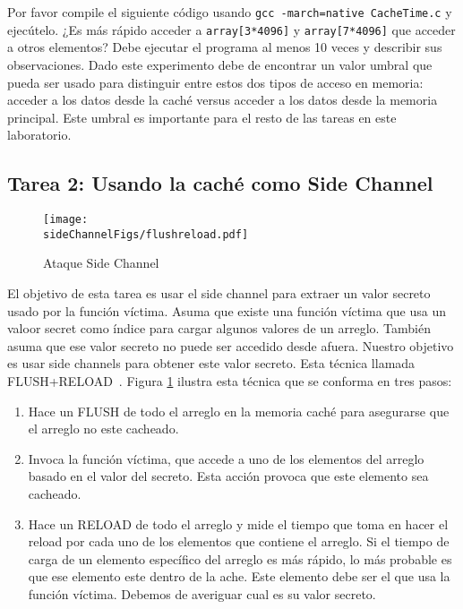 Por favor compile el siguiente código usando \texttt{gcc -march=native
CacheTime.c} y ejecútelo. ¿Es más rápido acceder a \texttt{array[3*4096]} y \texttt{array[7*4096]} que acceder a otros elementos? Debe ejecutar el programa al menos 10 veces y describir sus observaciones. Dado este experimento debe de encontrar un valor umbral que pueda ser usado para distinguir entre estos dos tipos de acceso en memoria: acceder a los datos desde la caché versus acceder a los datos desde la memoria principal. Este umbral es importante para el resto de las tareas en este laboratorio.

\subsection{Tarea 2: Usando la caché como Side Channel}


\begin{figure}[htb]
\centering
\texttt{[image: \\sideChannelFigs/flushreload.pdf]}
\caption{Ataque Side Channel}
\label{sidechannel:fig:flushreload}
\end{figure}

El objetivo de esta tarea es usar el side channel para extraer un valor secreto usado por la función víctima. Asuma que existe una función víctima que usa un valoor secret como índice para cargar algunos valores de un arreglo. También asuma que ese valor secreto no puede ser accedido desde afuera. Nuestro objetivo es usar side channels para obtener este valor secreto. Esta técnica llamada FLUSH+RELOAD~\cite{Yarom2014}. Figura \ref{sidechannel:fig:flushreload} ilustra esta técnica que se conforma en tres pasos:

\begin{enumerate}[noitemsep]

\item Hace un FLUSH de todo el arreglo en la memoria caché para asegurarse que el arreglo no este cacheado.

\item Invoca la función víctima, que accede a uno de los elementos del arreglo basado en el valor del secreto. Esta acción provoca que este elemento sea cacheado.

\item Hace un RELOAD de todo el arreglo y mide el tiempo que toma en hacer el reload por cada uno de los elementos que contiene el arreglo. Si el tiempo de carga de un elemento específico del arreglo es más rápido, lo más probable es que ese elemento este dentro de la ache.
Este elemento debe ser el que usa la función víctima. 
Debemos de averiguar cual es su valor secreto.
\end{enumerate}

